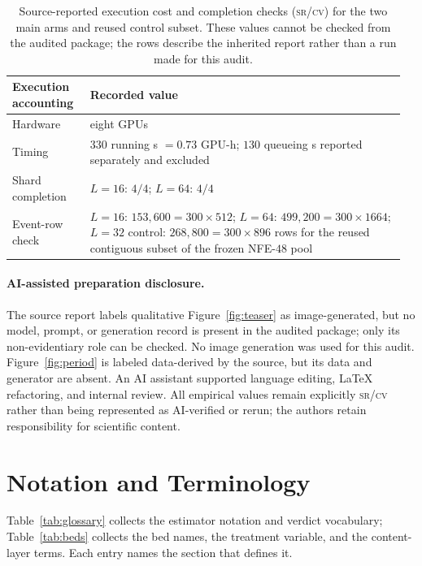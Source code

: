 \documentclass{article}
\newcommand{\srcv}{\textsc{sr/cv}}
\begin{document}
\begin{table}[H]
\centering
\footnotesize
\setlength{\tabcolsep}{2pt}
\begin{tabular}{@{}>{\raggedright\arraybackslash}p{0.19\linewidth}
                    >{\raggedright\arraybackslash}p{0.77\linewidth}@{}}
\toprule
Execution accounting & Recorded value \\
\midrule
Hardware & eight GPUs \\
Timing & $330$ running s $=0.73$ GPU-h; $130$ queueing s reported separately
and excluded \\
Shard completion & $L=16$: $4/4$; $L=64$: $4/4$ \\
Event-row check & $L=16$: $153{,}600=300\times512$;
$L=64$: $499{,}200=300\times1664$; $L=32$ control:
$268{,}800=300\times896$ rows for the reused contiguous subset of the frozen
NFE-$48$ pool \\
\bottomrule
\end{tabular}
\caption{Source-reported execution cost and completion checks (\srcv) for the
two main arms and reused control subset. These values cannot be checked from the
audited package; the rows describe the inherited report rather than a run made
for this audit.}
\label{tab:exec}
\end{table}

\paragraph{AI-assisted preparation disclosure.}
The source report labels qualitative Figure~\ref{fig:teaser} as
image-generated, but no model, prompt, or generation record is present in the
audited package; only its non-evidentiary role can be checked. No image
generation was used for this audit. Figure~\ref{fig:period} is labeled
data-derived by the source, but its data and generator are absent. An AI
assistant supported language editing, LaTeX refactoring, and internal review.
All empirical values remain explicitly \srcv{} rather than being represented as
AI-verified or rerun; the authors retain responsibility for scientific content.

\section{Notation and Terminology}\label{app:glossary}

Table~\ref{tab:glossary} collects the estimator notation and verdict vocabulary;
Table~\ref{tab:beds} collects the bed names, the treatment variable, and the
content-layer terms. Each entry names the section that defines it.
\end{document}
